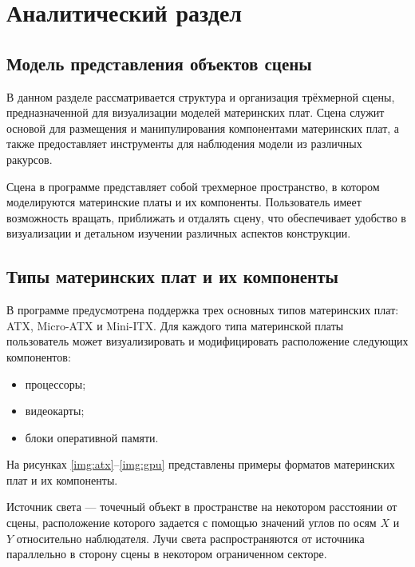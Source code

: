 \chapter{Аналитический раздел}

\section{Модель представления объектов сцены}

В данном разделе рассматривается структура и организация трёхмерной сцены, предназначенной для визуализации моделей материнских плат. Сцена служит основой для размещения и манипулирования компонентами материнских плат, а также предоставляет инструменты для наблюдения модели из различных ракурсов.

Сцена в программе представляет собой трехмерное пространство, в котором моделируются материнские платы и их компоненты. Пользователь имеет возможность вращать, приближать и отдалять сцену, что обеспечивает удобство в визуализации и детальном изучении различных аспектов конструкции.

\section{Типы материнских плат и их компоненты}

В программе предусмотрена поддержка трех основных типов материнских плат: ATX, Micro-ATX и Mini-ITX. Для каждого типа материнской платы пользователь может визуализировать и модифицировать расположение следующих компонентов:
\begin{itemize}[label=---]
	\item процессоры;
	\item видеокарты;
	\item блоки оперативной памяти.
\end{itemize}

На рисунках \ref{img:atx}--\ref{img:gpu} представлены примеры форматов материнских плат и их компоненты.

\clearpage

Источник света --- точечный объект в пространстве на некотором расстоянии от сцены, расположение которого задается с помощью значений углов по осям $X$ и $Y$ относительно наблюдателя. Лучи света распространяются от источника параллельно в сторону сцены в некотором ограниченном секторе.

